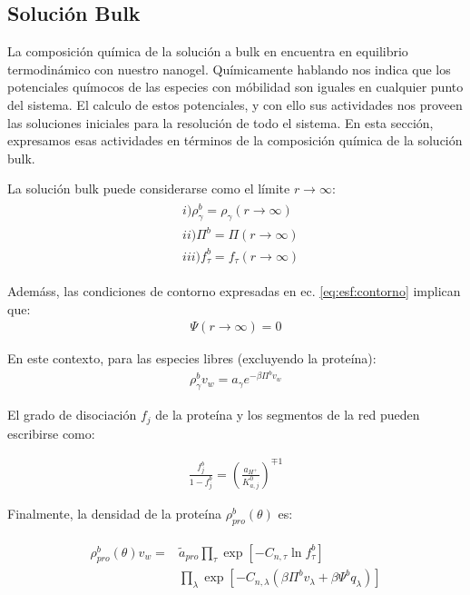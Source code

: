 \subsection{Soluci\'on Bulk}\label{sec:esf:bulk}

La composici\'on qu\'imica de la soluci\'on a bulk en encuentra en equilibrio termodin\'amico con nuestro nanogel. Qu\'imicamente hablando nos indica que los potenciales qu\'imocos de las especies con m\'obilidad son iguales en cualquier punto del sistema. 
El calculo de estos potenciales, y con ello sus actividades nos proveen  las soluciones iniciales para la resoluci\'on de todo el sistema.
En esta secci\'on, expresamos esas actividades en t\'erminos de la composici\'on qu\'imica de la soluci\'on bulk.

La soluci\'on bulk  puede considerarse como el límite $r \rightarrow \infty$:
\begin{align}
	\begin{aligned}
		& i)\rho^b_\gamma =\rho_\gamma (r \rightarrow \infty) \\
		& ii) \Pi^b = \Pi(r \rightarrow \infty) \\
		& iii) f_\tau^b = f_\tau(r \rightarrow \infty)
	\end{aligned}
\end{align}

Adem\'ass, las condiciones de contorno expresadas en ec. \ref{eq:esf:contorno} implican que:
\begin{align}
	\Psi(r \rightarrow \infty) = 0
\end{align}

En este contexto, para las especies libres (excluyendo la prote\'ina):
\begin{align}
	\rho_\gamma^b v_w = a_\gamma e^{-\beta\Pi^bv_w}
	\label{eq:esf:free-bulk}
\end{align}

El grado de disociaci\'on $f_j$ de la prote\'ina y los segmentos de la red pueden escribirse como:

\begin{align}
	\frac{f_j^b}{1-f_j^b} = \left(\frac{a_{H^+}}{K^0_{a,j}}\right)^{\mp 1}
\end{align}

Finalmente, la densidad de la prote\'ina $\rho_{pro}^b(\theta)$ es:

\begin{align}
	\begin{aligned}
		\rho^b_{pro}(\theta)v_w = &\tilde{a}_{pro} \prod_\tau\exp\left[-C_{n,\tau} \ln f^b_\tau\right] \\
		&\prod_\lambda \exp \left[-C_{n,\lambda} (\beta\Pi^b v_\lambda + \beta\Psi^b q_\lambda ) \right]
	\end{aligned}
	\label{eq:esf:bulk-protein}
\end{align}

